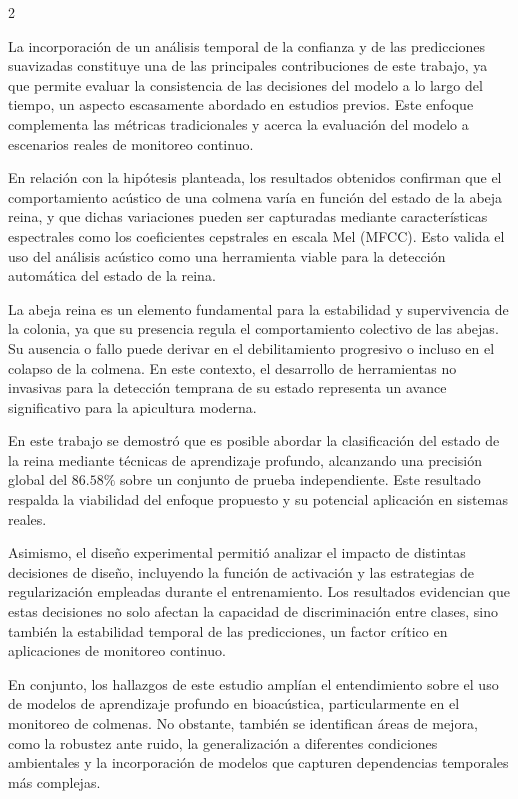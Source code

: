 \documentclass[12pt]{report}
\newenvironment{tightmulticols}{%
  \begin{multicols}{2}
  \setlength{\parskip}{1.2pt}
  \linespread{1}\selectfont
}{%
  \end{multicols}
}
\begin{document}
\begin{tightmulticols}

\noindent La incorporación de un análisis temporal de la confianza y de las predicciones suavizadas constituye una de las principales contribuciones de este trabajo, ya que permite evaluar la consistencia de las decisiones del modelo a lo largo del tiempo, un aspecto escasamente abordado en estudios previos. Este enfoque complementa las métricas tradicionales y acerca la evaluación del modelo a escenarios reales de monitoreo continuo.

\par En relación con la hipótesis planteada, los resultados obtenidos confirman que el comportamiento acústico de una colmena varía en función del estado de la abeja reina, y que dichas variaciones pueden ser capturadas mediante características espectrales como los coeficientes cepstrales en escala Mel (MFCC). Esto valida el uso del análisis acústico como una herramienta viable para la detección automática del estado de la reina.

\par La abeja reina es un elemento fundamental para la estabilidad y supervivencia de la colonia, ya que su presencia regula el comportamiento colectivo de las abejas. Su ausencia o fallo puede derivar en el debilitamiento progresivo o incluso en el colapso de la colmena. En este contexto, el desarrollo de herramientas no invasivas para la detección temprana de su estado representa un avance significativo para la apicultura moderna.

\par En este trabajo se demostró que es posible abordar la clasificación del estado de la reina mediante técnicas de aprendizaje profundo, alcanzando una precisión global del $86.58\%$ sobre un conjunto de prueba independiente. Este resultado respalda la viabilidad del enfoque propuesto y su potencial aplicación en sistemas reales.

\par Asimismo, el diseño experimental permitió analizar el impacto de distintas decisiones de diseño, incluyendo la función de activación y las estrategias de regularización empleadas durante el entrenamiento. Los resultados evidencian que estas decisiones no solo afectan la capacidad de discriminación entre clases, sino también la estabilidad temporal de las predicciones, un factor crítico en aplicaciones de monitoreo continuo.

\par En conjunto, los hallazgos de este estudio amplían el entendimiento sobre el uso de modelos de aprendizaje profundo en bioacústica, particularmente en el monitoreo de colmenas. No obstante, también se identifican áreas de mejora, como la robustez ante ruido, la generalización a diferentes condiciones ambientales y la incorporación de modelos que capturen dependencias temporales más complejas.


\end{tightmulticols}
\end{document}
